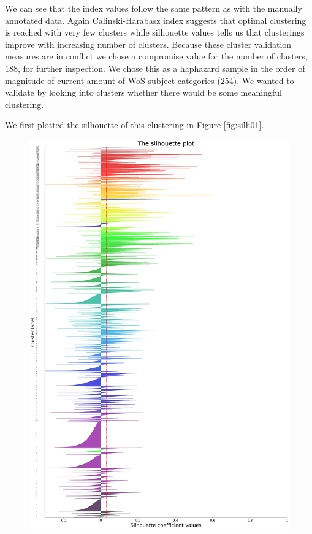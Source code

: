 We can see that the index values follow the same pattern as with 
the manually annotated data. Again Calinski-Harabasz index 
suggests that optimal clustering is reached with very few clusters
while silhouette values tells us that clusterings improve with 
increasing number of clusters. Because these cluster validation 
measures are in conflict we chose a compromise value for the 
number of clusters, $188$, for further inspection. We chose this 
as a haphazard sample in the order of magnitude of current amount 
of WoS subject categories ($254$).
We wanted to validate by looking into clusters whether there would
be some meaningful clustering.

We first plotted the silhouette of this clustering in Figure 
\ref{fig:silh01}.
\begin{figure}[htp]
  \begin{center}    
\includegraphics[width=13cm]{images/21155-188-800-hierarchical-silhouette.png}

\end{center}
\end{figure}
